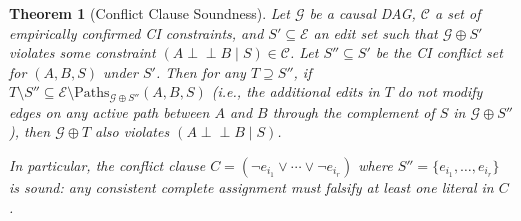 \documentclass[11pt,a4paper]{article}
\newtheorem{theorem}{Theorem}[section]
\theoremstyle{definition}
\theoremstyle{remark}
\newcommand{\CI}{\perp\!\!\!\perp}
\newcommand{\DAG}{\mathcal{G}}
\begin{document}
\begin{theorem}[Conflict Clause Soundness]\label{thm:conflict_sound}
Let $\DAG$ be a causal DAG, $\mathcal{C}$ a set of empirically confirmed CI
constraints, and $S' \subseteq \mathcal{E}$ an edit set such that
$\DAG \oplus S'$ violates some constraint $(A \CI B \mid S) \in \mathcal{C}$.
Let $S'' \subseteq S'$ be the CI conflict set for $(A, B, S)$ under $S'$.
Then for any $T \supseteq S''$, if $T \setminus S'' \subseteq
\mathcal{E} \setminus \mathrm{Paths}_{\DAG \oplus S''}(A, B, S)$ (i.e., the
additional edits in $T$ do not modify edges on any active path between $A$ and $B$
through the complement of $S$ in $\DAG \oplus S''$), then $\DAG \oplus T$
also violates $(A \CI B \mid S)$.

In particular, the conflict clause
$C = (\neg e_{i_1} \vee \cdots \vee \neg e_{i_r})$ where
$S'' = \{e_{i_1}, \ldots, e_{i_r}\}$ is \emph{sound}: any consistent
complete assignment must falsify at least one literal in $C$.
\end{theorem}
\end{document}
